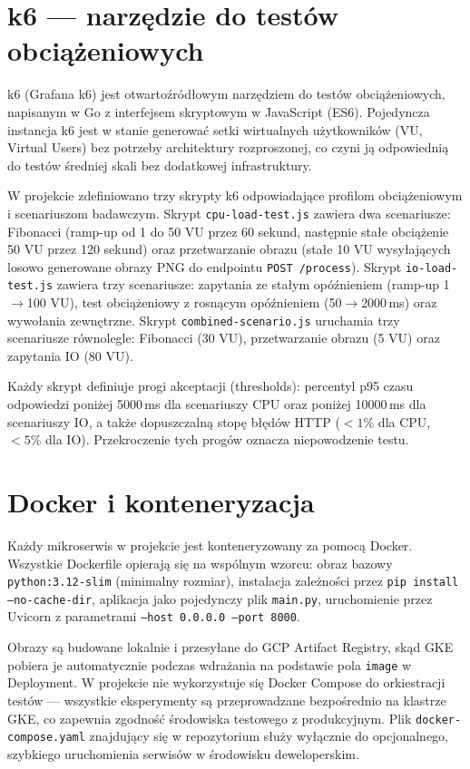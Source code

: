 \section{k6 --- narzędzie do testów obciążeniowych}

k6 (Grafana k6) jest otwartoźródłowym narzędziem do testów obciążeniowych, napisanym w Go z interfejsem skryptowym w JavaScript (ES6). Pojedyncza instancja k6 jest w stanie generować setki wirtualnych użytkowników (VU, Virtual Users) bez potrzeby architektury rozproszonej, co czyni ją odpowiednią do testów średniej skali bez dodatkowej infrastruktury.

W projekcie zdefiniowano trzy skrypty k6 odpowiadające profilom obciążeniowym i scenariuszom badawczym. Skrypt \texttt{cpu-load-test.js} zawiera dwa scenariusze: Fibonacci (ramp-up od 1 do 50 VU przez 60 sekund, następnie stałe obciążenie 50 VU przez 120 sekund) oraz przetwarzanie obrazu (stałe 10 VU wysyłających losowo generowane obrazy PNG do endpointu \texttt{POST /process}). Skrypt \texttt{io-load-test.js} zawiera trzy scenariusze: zapytania ze stałym opóźnieniem (ramp-up 1$\rightarrow$100 VU), test obciążeniowy z rosnącym opóźnieniem (50$\rightarrow$2000\,ms) oraz wywołania zewnętrzne. Skrypt \texttt{combined-scenario.js} uruchamia trzy scenariusze równolegle: Fibonacci (30 VU), przetwarzanie obrazu (5 VU) oraz zapytania IO (80 VU).

Każdy skrypt definiuje progi akceptacji (thresholds): percentyl p95 czasu odpowiedzi poniżej 5000\,ms dla scenariuszy CPU oraz poniżej 10000\,ms dla scenariuszy IO, a także dopuszczalną stopę błędów HTTP ($<1\%$ dla CPU, $<5\%$ dla IO). Przekroczenie tych progów oznacza niepowodzenie testu.

\section{Docker i konteneryzacja}

Każdy mikroserwis w projekcie jest konteneryzowany za pomocą Docker. Wszystkie Dockerfile opierają się na wspólnym wzorcu: obraz bazowy \texttt{python:3.12-slim} (minimalny rozmiar), instalacja zależności przez \texttt{pip install --no-cache-dir}, aplikacja jako pojedynczy plik \texttt{main.py}, uruchomienie przez Uvicorn z parametrami \texttt{--host 0.0.0.0 --port 8000}.

Obrazy są budowane lokalnie i przesyłane do GCP Artifact Registry, skąd GKE pobiera je automatycznie podczas wdrażania na podstawie pola \texttt{image} w Deployment. W projekcie nie wykorzystuje się Docker Compose do orkiestracji testów --- wszystkie eksperymenty są przeprowadzane bezpośrednio na klastrze GKE, co zapewnia zgodność środowiska testowego z produkcyjnym. Plik \texttt{docker-compose.yaml} znajdujący się w repozytorium służy wyłącznie do opcjonalnego, szybkiego uruchomienia serwisów w środowisku deweloperskim.

